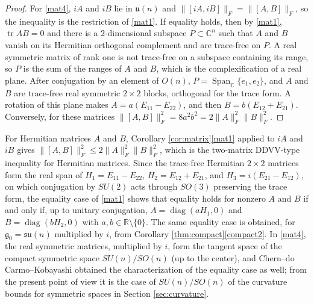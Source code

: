 \documentclass[leqno,10pt]{amsart}
\theoremstyle{definition}
\numberwithin{equation}{section}
\newcommand{\spn}{\operatorname{Span}}
\newcommand{\su}{\mathfrak{su}}
\newcommand{\g}{\mathfrak{g}}
\newcommand{\rea}{\mathbb R}
\newcommand{\com}{\mathbb C}
\newcommand{\tr}{\operatorname{tr}}
\newcommand{\gz}{\g_{0}}
\newcommand{\fnorm}[1]{\lVert #1\rVert_{F}}
\begin{document}
\begin{proof}
For \ref{mat4}, $iA$ and $iB$ lie in $\mathfrak{u}(n)$ and $\fnorm{[iA, iB]} = \fnorm{[A, B]}$, so the inequality is the restriction of \ref{mat1}. If equality holds, then by \ref{mat1}, $\tr AB = 0$ and there is a $2$-dimensional subspace $P \subset \com^{n}$ such that $A$ and $B$ vanish on its Hermitian orthogonal complement and are trace-free on $P$. A real symmetric matrix of rank one is not trace-free on a subspace containing its range, so $P$ is the sum of the ranges of $A$ and $B$, which is the complexification of a real plane. After conjugation by an element of $O(n)$, $P = \spn_{\com}\{e_{1}, e_{2}\}$, and $A$ and $B$ are trace-free real symmetric $2 \times 2$ blocks, orthogonal for the trace form. A rotation of this plane makes $A = a(E_{11} - E_{22})$, and then $B = b(E_{12} + E_{21})$. Conversely, for these matrices $\fnorm{[A, B]}^{2} = 8a^{2}b^{2} = 2\fnorm{A}^{2}\fnorm{B}^{2}$.
\end{proof}

For Hermitian matrices $A$ and $B$, Corollary \ref{cor:matrix}\ref{mat1} applied to $iA$ and $iB$ gives $\fnorm{[A, B]}^{2} \leq 2\fnorm{A}^{2}\fnorm{B}^{2}$, which is the two-matrix DDVV-type inequality for Hermitian matrices. Since the trace-free Hermitian $2 \times 2$ matrices form the real span of $H_{1} = E_{11} - E_{22}$, $H_{2} = E_{12} + E_{21}$, and $H_{3} = i(E_{21} - E_{12})$, on which conjugation by $SU(2)$ acts through $SO(3)$ preserving the trace form, the equality case of \ref{mat1} shows that equality holds for nonzero $A$ and $B$ if and only if, up to unitary conjugation, $A = \operatorname{diag}(aH_{1}, 0)$ and $B = \operatorname{diag}(bH_{2}, 0)$ with $a, b \in \rea \setminus \{0\}$. The same equality case is obtained, for $\gz = \su(n)$ multiplied by $i$, from Corollary \ref{thm:compact}\ref{compact2}.
In \ref{mat4}, the real symmetric matrices, multiplied by $i$, form the tangent space of the compact symmetric space $SU(n)/SO(n)$ (up to the center), and Chern--do Carmo--Kobayashi obtained the characterization of the equality case as well; from the present point of view it is the case of $SU(n)/SO(n)$ of the curvature bounds for symmetric spaces in Section \ref{sec:curvature}.
\end{document}
